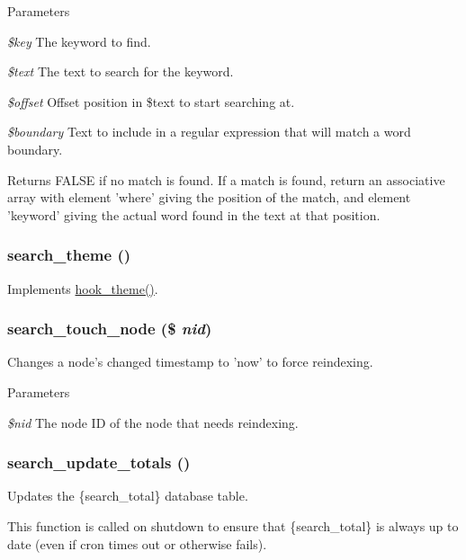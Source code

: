 \begin{DoxyParams}{Parameters}
\item[{\em \$key}]The keyword to find. \item[{\em \$text}]The text to search for the keyword. \item[{\em \$offset}]Offset position in \$text to start searching at. \item[{\em \$boundary}]Text to include in a regular expression that will match a word boundary.\end{DoxyParams}
\begin{DoxyReturn}{Returns}
FALSE if no match is found. If a match is found, return an associative array with element 'where' giving the position of the match, and element 'keyword' giving the actual word found in the text at that position. 
\end{DoxyReturn}
\hypertarget{search_8module_a8522ae1e4902ce2907b7515e340b711e}{
\subsubsection[{search\_\-theme}]{\setlength{\rightskip}{0pt plus 5cm}search\_\-theme ()}}
\label{search_8module_a8522ae1e4902ce2907b7515e340b711e}
Implements \hyperlink{group__hooks_ga013ccb45c7aaab1c16cf9691428c910d}{hook\_\-theme()}. \hypertarget{search_8module_a7f33ab55bf14157d58997bbe149e515d}{
\subsubsection[{search\_\-touch\_\-node}]{\setlength{\rightskip}{0pt plus 5cm}search\_\-touch\_\-node (\$ {\em nid})}}
\label{search_8module_a7f33ab55bf14157d58997bbe149e515d}
Changes a node's changed timestamp to 'now' to force reindexing.


\begin{DoxyParams}{Parameters}
\item[{\em \$nid}]The node ID of the node that needs reindexing. \end{DoxyParams}
\hypertarget{search_8module_a60e12125cc5e7713d2e73ad944b3ac24}{
\subsubsection[{search\_\-update\_\-totals}]{\setlength{\rightskip}{0pt plus 5cm}search\_\-update\_\-totals ()}}
\label{search_8module_a60e12125cc5e7713d2e73ad944b3ac24}
Updates the \{search\_\-total\} database table.

This function is called on shutdown to ensure that \{search\_\-total\} is always up to date (even if cron times out or otherwise fails). 